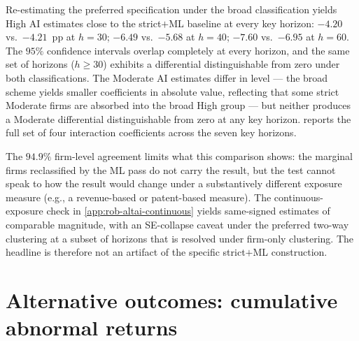 \begin{table}[htbp]
\centering\small

\end{table}

Re-estimating the preferred specification under the broad
classification yields High AI estimates close to the strict$+$ML
baseline at every key horizon: $-4.20$ vs.\ $-4.21$~pp at $h = 30$;
$-6.49$ vs.\ $-5.68$ at $h = 40$; $-7.60$ vs.\ $-6.95$ at $h = 60$. The $95\%$ confidence intervals overlap completely at
every horizon, and the same set of horizons ($h \geq 30$) exhibits a
differential distinguishable from zero under both classifications.
The Moderate AI estimates differ in level --- the broad scheme
yields smaller coefficients in absolute value, reflecting that some
strict Moderate firms are absorbed into the broad High group --- but
neither produces a Moderate differential distinguishable from zero
at any key horizon.  reports the full set of
four interaction coefficients across the seven key horizons.

\begin{table}[htbp]
\centering\small
\caption[Strict$+$ML versus original broad classification: key-horizon
estimates]{Strict$+$ML versus original broad classification:
key-horizon estimates}
\label{tab:alt_ai_key}

\end{table}

The $94.9\%$ firm-level agreement limits what this comparison shows:
the marginal firms reclassified by the ML pass do not carry the
result, but the test cannot speak to how the result would change
under a substantively different exposure measure (e.g., a
revenue-based or patent-based measure). The continuous-exposure check
in \cref{app:rob-altai-continuous} yields same-signed estimates of
comparable magnitude, with an SE-collapse caveat under the preferred
two-way clustering at a subset of horizons that is resolved under
firm-only clustering. The headline is therefore not an artifact of
the specific strict$+$ML construction.

\section{Alternative outcomes: cumulative abnormal returns}
\label{sec:rob-altoutcomes}

